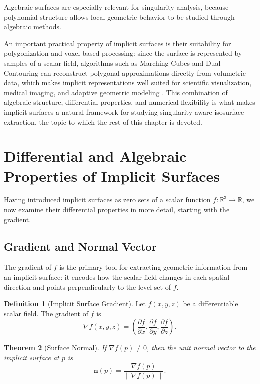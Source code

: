 \documentclass[12pt, a4paper, oneside]{book}
\theoremstyle{plain}
\newtheorem{theorem}{Theorem}[chapter]
\theoremstyle{definition}
\newtheorem{definition}[theorem]{Definition}
\theoremstyle{remark}
\theoremstyle{definition}
\begin{document}
Algebraic surfaces are especially relevant for singularity analysis, because polynomial
structure allows local geometric behavior to be studied through algebraic methods.

An important practical property of implicit surfaces is their suitability for
polygonization and voxel-based processing: since the surface is represented by samples
of a scalar field, algorithms such as Marching Cubes and Dual Contouring can reconstruct
polygonal approximations directly from volumetric data, which makes implicit
representations well suited for scientific visualization, medical imaging, and adaptive
geometric modeling \cite{bloomenthal2000implicit}. This combination of algebraic
structure, differential properties, and numerical flexibility is what makes implicit
surfaces a natural framework for studying singularity-aware isosurface extraction, the
topic to which the rest of this chapter is devoted.

\section{Differential and Algebraic Properties of Implicit Surfaces}

Having introduced implicit surfaces as zero sets of a scalar function
$f:\mathbb{R}^3 \rightarrow \mathbb{R}$, we now examine their differential properties in
more detail, starting with the gradient.

\subsection{Gradient and Normal Vector}

The gradient of $f$ is the primary tool for extracting geometric information from an
implicit surface: it encodes how the scalar field changes in each spatial direction and
points perpendicularly to the level set of $f$.

\begin{definition}[Implicit Surface Gradient]
Let $f(x,y,z)$ be a differentiable scalar field. The gradient of $f$ is
\[
\nabla f(x,y,z) = \left(\frac{\partial f}{\partial x}, \frac{\partial f}{\partial y},
\frac{\partial f}{\partial z}\right).
\]
\end{definition}

\begin{theorem}[Surface Normal]
If $\nabla f(p) \neq 0$, then the unit normal vector to the implicit surface at $p$ is
\[
\mathbf{n}(p) = \frac{\nabla f(p)}{\|\nabla f(p)\|}.
\]
\end{theorem}
\end{document}
